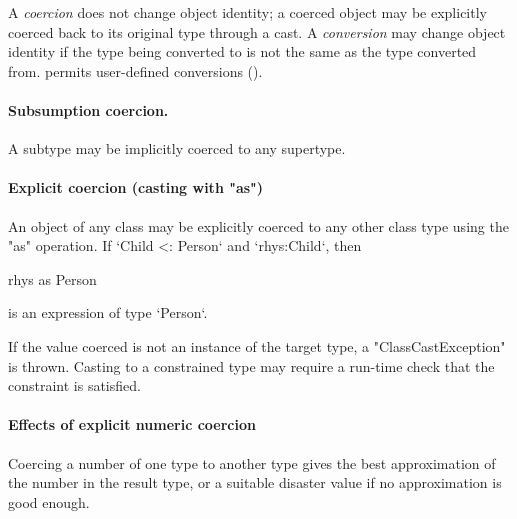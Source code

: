 A {\em coercion} does not change object identity; a coerced object may
be explicitly coerced back to its original type through a cast. A {\em
  conversion} may change object identity if the type being converted
to is not the same as the type converted from. \Xten{} permits
user-defined conversions ().

\paragraph{Subsumption coercion.}
A subtype may be implicitly coerced to any supertype.

\paragraph{Explicit coercion (casting with \xcd"as")}
An object of any class may be explicitly coerced to any other
class type using the \xcd"as" operation.  If \xcd`Child <: Person` and
\xcd`rhys:Child`, then 
\begin{xten}
  rhys as Person
\end{xten}
is an expression of type \xcd`Person`.  

If the value coerced is not an instance of the target type,
a \xcd"ClassCastException" is thrown.  Casting to a constrained
type may require a run-time check that the constraint is
satisfied.


\paragraph{Effects of explicit numeric coercion}
\label{sec:effects-of-explicit-numeric-coercions}

Coercing a number of one type to another type gives the best approximation of
the number in the result type, or a suitable disaster value if no
approximation is good enough.  


